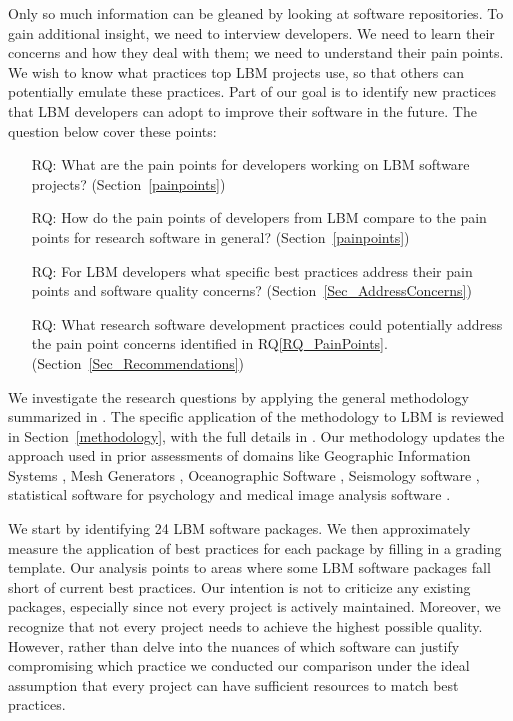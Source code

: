 \documentclass[final, 3p, times, authoryear]{elsarticle}
\newcounter{rqnum} %
\newcommand{\rqref}[1]{RQ\ref{#1}}
\begin{document}
Only so much information can be gleaned by looking at software repositories.  To
gain additional insight, we need to interview developers.  We need to learn
their concerns and how they deal with them; we need to understand their pain
points. We wish to know what practices top LBM projects use, so that
others can potentially emulate these practices. Part of our goal is to identify new
practices that LBM developers can adopt to improve their software in the future.
The question below cover these points: 

\begin{enumerate}
	\item [RQ\refstepcounter{rqnum}\therqnum \label{RQ_PainPoints}:] What are
	the pain points for developers working on LBM software projects?
	(Section~\ref{painpoints})
	\item [RQ\refstepcounter{rqnum}\therqnum \label{RQ_ComparePainPoints}:] How
	do the pain points of developers from LBM compare to the pain points
	for research software in general? (Section~\ref{painpoints})
	\item [RQ\refstepcounter{rqnum}\therqnum \label{RQ_Concerns}:] For LBM
	developers what specific best practices address their pain points
	and software quality concerns? (Section~\ref{Sec_AddressConcerns})
	\item [RQ\refstepcounter{rqnum}\therqnum \label{RQ_Recommend}:]
	What research software development practices could potentially address the
	pain point concerns identified in \rqref{RQ_PainPoints}.
	(Section~\ref{Sec_Recommendations})
\end{enumerate}

We investigate the research questions by applying the general methodology
summarized in \citet{SmithEtAl2021, SmithAndMichalski2022}.  The specific
application of the methodology to LBM is reviewed in Section~\ref{methodology},
with the full details in \citet{Michalski2021}.  Our methodology updates
the approach used in prior assessments of domains like Geographic Information
Systems \citep{SmithEtAl2018_arXivGIS}, Mesh Generators \citep{SmithEtAl2016},
Oceanographic Software \citep{smith2015state}, Seismology software
\citep{SmithEtAl2018}, statistical software for psychology
\citep{SmithEtAl2018_StatSoft} and medical image analysis software
\citep{Dong2021}.

We start by identifying 24 LBM software packages.  We then approximately measure
the application of best practices for each package by filling in a grading
template. Our analysis points to areas where some LBM software packages fall
short of current best practices.  Our intention is not to criticize any existing
packages, especially since not every project is actively maintained.  Moreover,
we recognize that not every project needs to achieve the highest possible
quality.  However, rather than delve into the nuances of which software can
justify compromising which practice we conducted our comparison under the ideal
assumption that every project can have sufficient resources to match best
practices.
\end{document}
